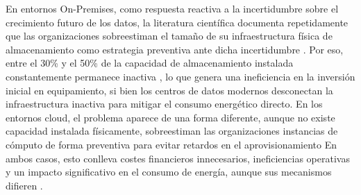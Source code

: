 En entornos On-Premises, como respuesta reactiva a la incertidumbre sobre el crecimiento futuro de los datos, la literatura científica documenta repetidamente que las organizaciones sobreestiman el tamaño de su infraestructura física de almacenamiento como estrategia preventiva ante dicha incertidumbre \parencite{cortez2017resource}.
Por eso, entre el 30\% y el 50\% de la capacidad de almacenamiento instalada constantemente permanece inactiva \parencite{cortez2017resource}, lo que genera una ineficiencia en la inversión inicial en equipamiento, si bien los centros de datos modernos desconectan la infraestructura inactiva para mitigar el consumo energético directo.
En los entornos cloud, el problema aparece de una forma diferente, aunque no existe capacidad instalada físicamente, sobreestiman las organizaciones instancias de cómputo de forma preventiva para evitar retardos en el aprovisionamiento
En ambos casos, esto conlleva costes financieros innecesarios, ineficiencias operativas y un impacto significativo en el consumo de energía, aunque sus mecanismos difieren \parencite{cortez2017resource}.


